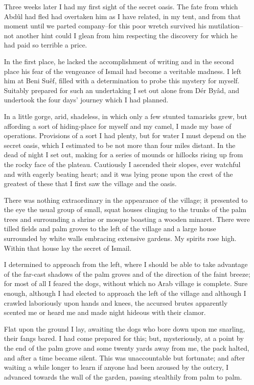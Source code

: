 Three weeks later I had my first sight of the secret oasis. The fate
from which Abdûl had fled had overtaken him as I have related, in my
tent, and from that moment until we parted company--for this poor
wretch survived his mutilation--not another hint could I glean from
him respecting the discovery for which he had paid so terrible a
price.

In the first place, he lacked the accomplishment of writing and in
the second place his fear of the vengeance of Ismail had become a
veritable madness. I left him at Beni Suêf, filled with a
determination to probe this mystery for myself. Suitably prepared for
such an undertaking I set out alone from Dér Byâd, and undertook the
four days' journey which I had planned.

In a little gorge, arid, shadeless, in which only a few stunted
tamarisks grew, but affording a sort of hiding-place for myself and
my camel, I made my base of operations. Provisions of a sort I had
plenty, but for water I must depend on the secret oasis, which I
estimated to be not more than four miles distant. In the dead of night
I set out, making for a series of mounds or hillocks rising up from
the rocky face of the plateau. Cautiously I ascended their slopes,
ever watchful and with eagerly beating heart; and it was lying prone
upon the crest of the greatest of these that I first saw the village
and the oasis.

There was nothing extraordinary in the appearance of the village; it
presented to the eye the usual group of small, squat houses clinging
to the trunks of the palm trees and surrounding a shrine or mosque
boasting a wooden minaret. There were tilled fields and palm groves
to the left of the village and a large house surrounded by white walls
embracing extensive gardens. My spirits rose high. Within that house
lay the secret of Ismail.

I determined to approach from the left, where I should be able to
take advantage of the far-cast shadows of the palm groves and of
the direction of the faint breeze; for most of all I feared the dogs,
without which no Arab village is complete. Sure enough, although I
had elected to approach the left of the village and although I crawled
laboriously upon hands and knees, the accursed brutes apparently
scented me or heard me and made night hideous with their clamor.

Flat upon the ground I lay, awaiting the dogs who bore down upon me
snarling, their fangs bared. I had come prepared for this; but,
mysteriously, at a point by the end of the palm grove and some twenty
yards away from me, the pack halted, and after a time became silent.
This was unaccountable but fortunate; and after waiting a while longer
to learn if anyone had been aroused by the outcry, I advanced towards
the wall of the garden, passing stealthily from palm to palm.

